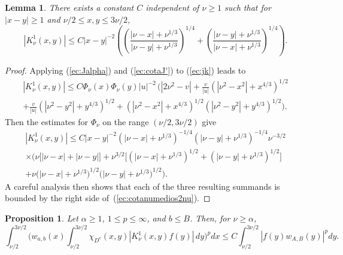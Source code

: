 \documentclass[leqno,a4paper]{amsart}
\newtheorem{Prop}{Proposition}
\newtheorem{Lem}{Lemma}
\begin{document}
\begin{Lem}
\label{Lem:L3}
There exists a constant $C$ independent of $\nu\ge1$ such that for
$|x-y|\ge 1$ and $\nu/2\le x,y\le 3\nu/2$,
\begin{equation}
\label{ec:cotanumedios2nu}
|K^1_\nu(x,y)|\le C |x-y|^{-2}
\left(\left(\frac{|\nu-x|+\nu^{1/3}}{|\nu-y|+\nu^{1/3}}\right)^{1/4}
+ \left(\frac{|\nu-y|+\nu^{1/3}}{|\nu-x|+\nu^{1/3}}\right)^{1/4}\right).
\end{equation}
\end{Lem}
\begin{proof}

Applying (\ref{ec:Jalpha}) and (\ref{ec:cotaJ'}) to (\ref{ec:jk}) leads to
\begin{multline}
\label{ec:basic}
|K_\nu^1(x,y)|\le C \Phi_\nu(x)\Phi_\nu(y)|u|^{-2}\,
\bigg(|2\nu^2-v|+\frac{v}{|u|}(|\nu^2-x^2|+x^{4/3})^{1/2}\\
+ \frac{v}{|u|}(|\nu^2-y^2|+y^{4/3})^{1/2}
+ (|\nu^2-x^2|+x^{4/3})^{1/2}(|\nu^2-y^2|+y^{4/3})^{1/2}\bigg).
\end{multline}
Then the estimates for
$\Phi_\nu$ on the range $(\nu/2,3\nu/2)$ give
\begin{multline*}
|K_\nu^1(x,y)|\le C|x-y|^{-2}(|\nu-x|+\nu^{1/3})^{-1/4}(|\nu-y|+\nu^{1/3})
^{-1/4}\nu^{-3/2}\\ \times
\bigg(\nu\big[|\nu-x|+|\nu-y|\big]+\nu^{3/2}\big[(|\nu-x|+\nu^{1/3})^{1/2}+
(|\nu-y|+\nu^{1/3})^{1/2}\big]\\
+\nu\big(|\nu-x|+\nu^{1/3}\big)^{1/2}\big(|\nu-y|+\nu^{1/3}\big)^{1/2}\bigg).
\end{multline*}
A careful analysis then shows that each of the three resulting summands is
bounded by the right side of~(\ref{ec:cotanumedios2nu}).
\end{proof}

\begin{Prop}
\label{Prop:P3}
Let $\alpha\ge1$, $1\le p\le\infty$, and $b\le B$. Then, for $\nu\ge \alpha$,
\begin{equation}
\label{ec:d2}
\int_{\nu/2}^{3\nu/2} \bigg(w_{a,b}(x)
\int_{\nu/2}^{3\nu/2}\chi_{D^c}(x,y)|K_\nu^{1}(x,y)f(y)|\,dy\bigg)^p dx
\le C\int_{\nu/2}^{3\nu/2}\left|f(y)w_{A,B}(y)\right|^p dy.
\end{equation}
\end{Prop}
\end{document}
